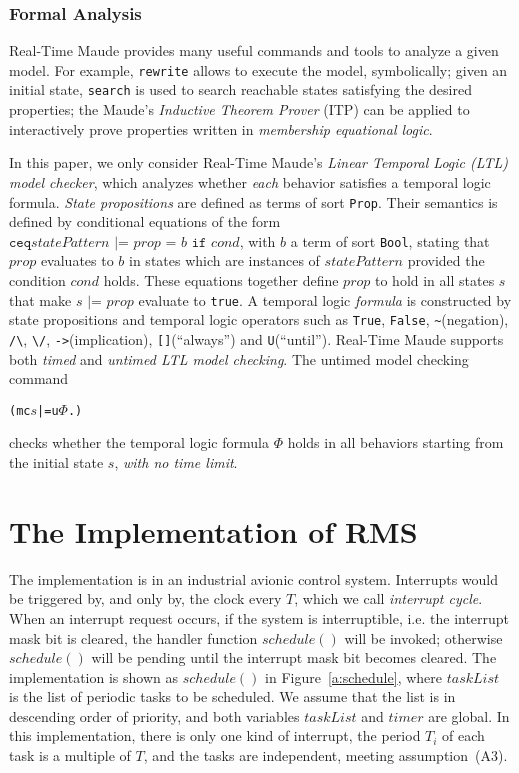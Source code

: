 \documentclass[10pt,journal]{IEEEtran}
\begin{document}
\subsubsection{Formal Analysis}
Real-Time Maude provides many useful commands and tools to analyze a
given model. For example, \verb|rewrite| allows to execute the model,
symbolically; given an initial state, \verb|search| is used to search
reachable states satisfying the desired properties; the Maude's
\emph{Inductive Theorem Prover} (ITP) can be applied to interactively
prove properties written in \emph{membership equational logic}.

In this paper, we only consider Real-Time Maude's \emph{Linear
  Temporal Logic (LTL) model checker}, which analyzes whether
\emph{each} behavior satisfies a temporal logic formula. \emph{State
  propositions} are defined as terms of sort \verb|Prop|. Their
semantics is defined by conditional equations of the form $\texttt{ceq
} statePattern \texttt{ |= } prop \texttt{ = } b \texttt{ if } cond$,
with $b$ a term of sort \verb|Bool|, stating that $prop$ evaluates to
$b$ in states which are instances of $statePattern$ provided the
condition $cond$ holds. These equations together define $prop$ to hold
in all states $s$ that make $s \texttt{ |= } prop$ evaluate to
\verb|true|. A temporal logic \emph{formula} is constructed by state
propositions and temporal logic operators such as \verb|True|,
\verb|False|, \verb|~|(negation), \verb|/\|, \verb|\/|,
\verb|->|(implication), \verb|[]|(``always'') and
\verb|U|(``until''). Real-Time Maude supports both \emph{timed} and
\emph{untimed LTL model checking}. The untimed model checking command
\begin{alltt}
  (mc \(s\) |=u \(\Phi\) .)
\end{alltt}
checks whether the temporal logic formula $\Phi$ holds in all
behaviors starting from the initial state $s$, \emph{with no time
  limit}.


\section{The Implementation of RMS}
\label{s:imp}
The implementation is in an industrial avionic control system.
Interrupts would be triggered by, and only by, the clock every $T$,
which we call \emph{interrupt cycle}. When an interrupt request
occurs, if the system is interruptible, i.e. the interrupt mask bit is
cleared, the handler function $schedule()$ will be invoked; otherwise
$schedule()$ will be pending until the interrupt mask bit becomes
cleared.  The implementation is shown as $schedule()$ in
Figure~\ref{a:schedule}, where $taskList$ is the list of periodic
tasks to be scheduled. We assume that the list is in descending order
of priority, and both variables $taskList$ and $timer$ are global. In
this implementation, there is only one kind of interrupt, the period
$T_i$ of each task is a multiple of $T$, and the tasks are
independent, meeting assumption~(A3).
\end{document}
